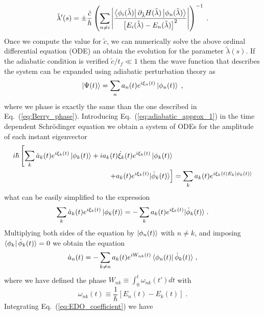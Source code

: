 \begin{equation}
\tilde{\lambda}'(s)=\pm \frac{\tilde{c}}{\hbar}\left(\sum_{n\neq i}\abs{\frac{\bra{\phi_i(\tilde{\lambda})}\partial_{\tilde{\lambda}} H(\tilde{\lambda})\ket{\phi_n(\tilde{\lambda})}}{\left[E_i(\tilde{\lambda})-E_n(\tilde{\lambda})\right]^2}}\right)^{-1}\; .
\label{eq:parameter_ODE_2}
\end{equation}
Once we compute the value for $\tilde{c}$, we can numerically solve the above ordinal differential equation (ODE) an obtain the evolution for the parameter $\tilde{\lambda}(s)$. If the adiabatic condition is verified $\tilde{c}/t_f\ll 1$ them the wave function that describes the system can be expanded using adiabatic perturbation theory as
\begin{equation}
	\ket{\Psi(t)}=\sum_na_n(t)e^{i\xi_n(t)}\ket{\phi_n(t)}\; ,
	\label{eq:adiabatic_approx_1}
\end{equation}
where we phase is exactly the same than the one described in Eq.~(\ref{eq:Berry_phase}). Introducing Eq.~(\ref{eq:adiabatic_approx_1}) in the time dependent Schrödinger equation we obtain a system of ODEs for the amplitude of each instant eigenvector
\begin{equation}
	\begin{split}
	i\hbar\left[\sum_k\dot{a}_k(t)e^{i\xi_k(t)}\ket{\phi_k(t)}+ia_k(t)\dot{\xi}_k(t)e^{i\xi_k(t)}\ket{\phi_k(t)}\right.&\\
	\left.+a_k(t)e^{i\xi_k(t)}|\dot{\phi}_k(t)\rangle\right]&=\sum_k a_k(t)e^{i\xi_k(t)E_k\ket{\phi_k(t)}}
	\end{split}
\end{equation}
what can be easily simplified to the expression
\begin{equation}
	\sum_k \dot{a}_k(t)e^{i\xi_k(t)}\ket{\phi_k(t)}=-\sum_ka_k(t)e^{i\xi_k(t)}|\dot{\phi}_k(t)\rangle\; .
\end{equation}
Multiplying both sides of the equation by $\ket{\phi_n(t)}$ with $n\neq k$, and imposing $\bra{\phi_k}\dot{\phi}_k(t)\rangle=0$ we obtain the equation
\begin{equation}
	\dot{a}_n(t)=-\sum_{k\neq n}a_k(t)e^{iW_{nk}(t)}\bra{\phi_n(t)}\dot{\phi}_k(t)\rangle\; ,
	\label{eq:EDO_coefficient}
\end{equation}
where we have defined the phase $W_{nk}\equiv \int_0^t\omega_{nk}(t')dt$ with
\begin{equation}
	\omega_{nk}(t)\equiv \frac{1}{\hbar}[E_n(t)-E_k(t)]\; .
\end{equation}
Integrating Eq.~(\ref{eq:EDO_coefficient}) we have
